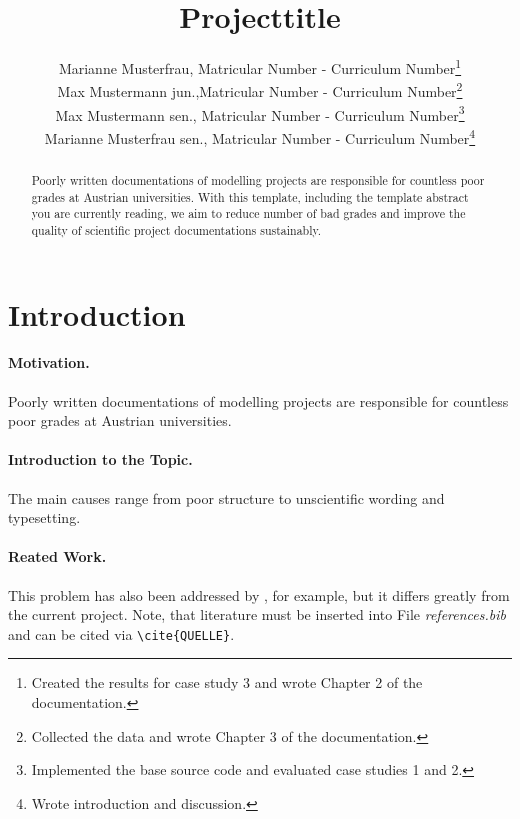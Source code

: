 \documentclass[a4paper,11pt]{scrartcl}
\begin{document}
\subject{LVA-Modeling and Simulation}
\title{Projecttitle}

\publishers{Supervisor: Max Mustermann}
\author{Marianne Musterfrau, Matricular Number - Curriculum Number\footnote{Created the results for case study 3 and wrote Chapter 2 of the documentation.}\\
Max Mustermann jun.,Matricular Number - Curriculum Number\footnote{Collected the data and wrote Chapter 3 of the documentation.}\\
Max Mustermann sen., Matricular Number - Curriculum Number\footnote{Implemented the base source code and evaluated case studies 1 and 2.}\\
Marianne Musterfrau sen., Matricular Number - Curriculum Number\footnote{Wrote introduction and discussion.}}

\maketitle

\begin{abstract}
Poorly written documentations of modelling projects are responsible for countless poor grades at Austrian universities. With this template, including the template abstract you are currently reading, we aim to reduce number of bad grades and improve the quality of scientific project documentations sustainably.
\end{abstract}

\newpage

\tableofcontents

\newpage

\section{Introduction}
\paragraph{Motivation.} 
Poorly written documentations of modelling projects are responsible for countless poor grades at Austrian universities. 
\paragraph{Introduction to the Topic.} The main causes range from poor structure to unscientific wording and typesetting.
\paragraph{Reated Work.} This problem has also been addressed by \cite{zeigler2000theory}, for example, but it differs greatly from the current project. Note, that literature must be inserted into File \textit{references.bib} and can be cited via \verb|\cite{QUELLE}|.
\end{document}
